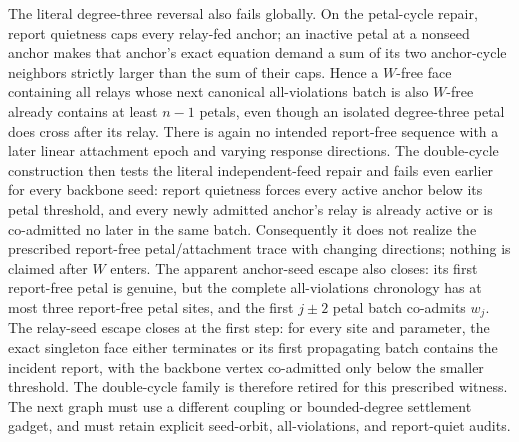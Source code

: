 The literal degree-three reversal also fails globally.  On the petal-cycle
repair, report quietness caps every relay-fed anchor; an inactive petal at a
nonseed anchor makes that anchor's exact equation demand a sum of its two
anchor-cycle neighbors strictly larger than the sum of their caps.  Hence a
$W$-free face containing all relays whose next canonical all-violations batch
is also $W$-free already contains at least $n-1$ petals, even though an
isolated degree-three petal does cross after its relay.  There is again no
intended report-free sequence with a later linear attachment epoch and
varying response directions.  The double-cycle construction then tests the
literal independent-feed repair and fails even earlier for every backbone
seed: report quietness forces every active anchor below its petal threshold,
and every newly admitted anchor's relay is already active or is co-admitted
no later in the same batch.  Consequently it does not realize the prescribed
report-free petal/attachment trace with changing directions; nothing is
claimed after $W$ enters.  The apparent anchor-seed escape also closes: its
first report-free petal is genuine, but the complete all-violations chronology
has at most three report-free petal sites, and the first $j\pm2$ petal batch
co-admits $w_j$.  The relay-seed escape closes at the first step: for every
site and parameter, the exact singleton face either terminates or its first
propagating batch contains the incident report, with the backbone vertex
co-admitted only below the smaller threshold.  The double-cycle family is
therefore retired for this prescribed witness.  The next graph must use a
different coupling or bounded-degree settlement gadget, and must retain
explicit seed-orbit, all-violations, and report-quiet audits.
